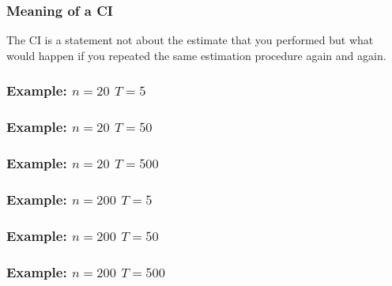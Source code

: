 \begin{frame}[fragile]\frametitle{Meaning of a CI}

The CI is a statement not about the estimate that you performed
but what would happen if you repeated the same estimation
procedure again and again.
\end{frame}

\begin{frame}[fragile]\frametitle{Example: $n=20$ $T=5$}

\center{\texttt{[image: CI2]} }
\end{frame}


\begin{frame}[fragile]\frametitle{Example: $n=20$ $T=50$}

\center{\texttt{[image: CI1]} }
\end{frame}


\begin{frame}[fragile]\frametitle{Example: $n=20$ $T=500$}

\center{\texttt{[image: CI3]} }

\end{frame}


\begin{frame}[fragile]\frametitle{Example: $n=200$ $T=5$}

\center{\texttt{[image: CI4]} }

\end{frame}


\begin{frame}[fragile]\frametitle{Example: $n=200$ $T=50$}

\center{\texttt{[image: CI5]} }

\end{frame}

\begin{frame}[fragile]\frametitle{Example: $n=200$ $T=500$}

\center{\texttt{[image: CI6]} }

\end{frame}

